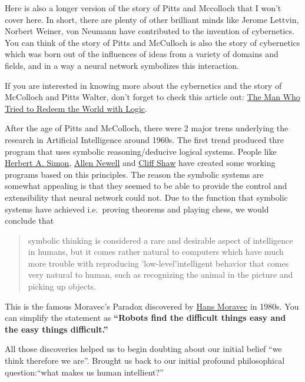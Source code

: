 \documentclass[]{book}
\theoremstyle{definition}
\theoremstyle{definition}
\theoremstyle{definition}
\theoremstyle{remark}
\begin{document}
Here is also a longer version of the story of Pitts and Mccolloch that I
won't cover here. In short, there are plenty of other brilliant minds
like Jerome Lettvin, Norbert Weiner, von Neumann have contributed to the
invention of cybernetics. You can think of the story of Pitts and
McCulloch is also the story of cybernetics which was born out of the
influences of ideas from a variety of domains and fields, and in a way a
neural network symbolizes this interaction.

If you are interested in knowing more about the cybernetics and the
story of McColloch and Pitts Walter, don't forget to check this article
out:
\href{http://nautil.us/issue/21/information/the-man-who-tried-to-redeem-the-world-with-logic}{The
Man Who Tried to Redeem the World with Logic}.

After the age of Pitts and McColloch, there were 2 major trens
underlying the research in Artificial Intelligence around 1960s. The
first trend produced thre program that uses symbolic reasoning/deducive
logical systems. People like
\href{https://en.wikipedia.org/wiki/Herbert_A._Simon}{Herbert A. Simon},
\href{https://en.wikipedia.org/wiki/Allen_Newell}{Allen Newell} and
\href{https://en.wikipedia.org/wiki/Cliff_Shaw}{Cliff Shaw} have created
some working programs based on this principles. The reason the symbolic
systems are somewhat appealing is that they seemed to be able to provide
the control and extensibility that neural network could not. Due to the
function that symbolic systems have achieved i.e.~proving theorems and
playing chess, we would conclude that

\begin{quote}
symbolic thinking is considered a rare and desirable aspect of
intelligence in humans, but it comes rather natural to computers which
have much more trouble with reproducing 'low-level'intelligent behavior
that comes very natural to human, such as recognizing the animal in the
picture and picking up objects.
\end{quote}

This is the famous Moravec's Paradox discovered by
\href{https://en.wikipedia.org/wiki/Hans_Moravec}{Hans Moravec} in
1980s. You can simplify the statement as \textbf{``Robots find the
difficult things easy and the easy things difficult.''}

All those discoveries helped us to begin doubting about our initial
belief ``we think therefore we are''. Brought us back to our initial
profound philosophical question:``what makes us human intellient?''
\end{document}
